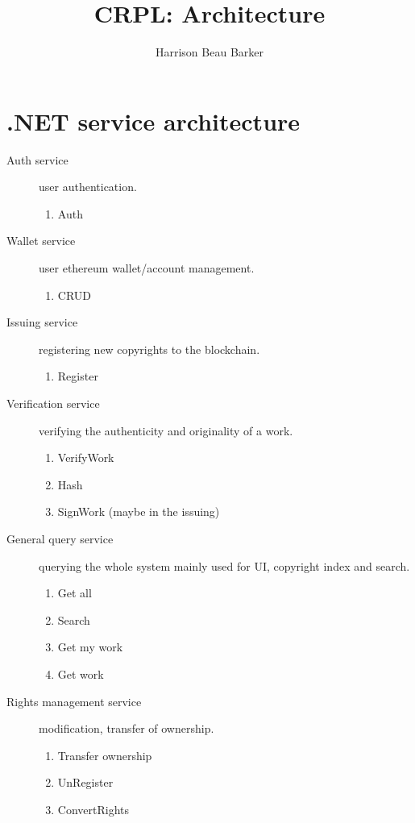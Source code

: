 \documentclass[12pt]{article}
\title{CRPL: Architecture}
\author{Harrison Beau Barker}
\begin{document}
	\maketitle
	
	\section{.NET service architecture}
	
	\begin{description}
		\item[Auth service] user authentication.
			\begin{enumerate}
				\item Auth
			\end{enumerate}
		\item[Wallet service] user ethereum wallet/account management.
			\begin{enumerate}
				\item CRUD
			\end{enumerate}
		\item[Issuing service] registering new copyrights to the blockchain.
			\begin{enumerate}
				\item Register
			\end{enumerate}
		\item[Verification service] verifying the authenticity and originality of a work.
			\begin{enumerate}
				\item VerifyWork
				\item Hash
				\item SignWork (maybe in the issuing)
			\end{enumerate}
		\item[General query service] querying the whole system mainly used for UI, copyright index and search.
			\begin{enumerate}
				\item Get all
				\item Search
				\item Get my work
				\item Get work
			\end{enumerate}
		\item[Rights management service] modification, transfer of ownership.
			\begin{enumerate}
				\item Transfer ownership
				\item UnRegister
				\item ConvertRights

\end{enumerate}
\end{description}
\end{document}
